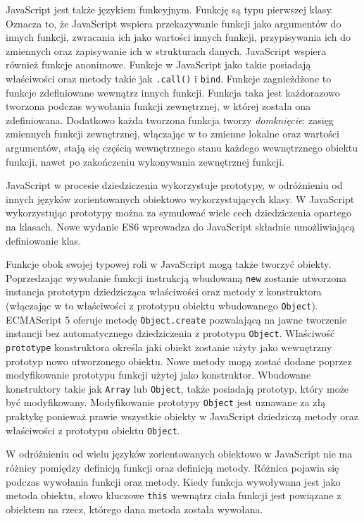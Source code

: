 JavaScript jest także językiem funkcyjnym. Funkcję są typu pierwszej klasy. Oznacza to, że JavaScript wspiera przekazywanie funkcji jako argumentów do innych funkcji, zwracania ich jako wartości innych funkcji, przypisywania ich do zmiennych oraz zapisywanie ich w strukturach danych. JavaScript wspiera również funkcje anonimowe\cite{fcfunctionWiki}. Funkcje w JavaScript jako takie posiadają właściwości oraz metody takie jak \verb|.call()| i \verb|bind|. Funkcje zagnieżdżone to funkcje zdefiniowane wewnątrz innych funkcji. Funkcja taka jest każdorazowo tworzona podczas wywołania funkcji zewnętrznej, w której została ona zdefiniowana. Dodatkowo każda tworzona funkcja tworzy \emph{domknięcie}: zasięg zmiennych funkcji zewnętrznej, włączając w to zmienne lokalne oraz wartości argumentów, stają się częścią wewnętrznego stanu każdego wewnętrznego obiektu funkcji, nawet po zakończeniu wykonywania zewnętrznej funkcji\cite{jsWiki}.

JavaScript w procesie dziedziczenia wykorzystuje prototypy, w odróżnieniu od innych języków zorientowanych obiektowo wykorzystujących klasy. W JavaScript wykorzystując prototypy można za symulować wiele cech dziedziczenia opartego na klasach\cite{jsWiki}. Nowe wydanie ES6 wprowadza do JavaScript składnie umożliwiającą definiowanie klas.  

Funkcje obok swojej typowej roli w JavaScript mogą także tworzyć obiekty. Poprzedzając wywołanie funkcji instrukcją wbudowaną \verb|new| zostanie utworzona instancja prototypu dziedzicząca właściwości oraz metody z konstruktora (włączając w to właściwości z prototypu obiektu wbudowanego \verb|Object|). ECMAScript 5 oferuje metodę \verb|Object.create| pozwalającą na jawne tworzenie instancji bez automatycznego dziedziczenia z prototypu \verb|Object|. Właściwość \verb|prototype| konstruktora określa jaki obiekt zostanie użyty jako wewnętrzny prototyp nowo utworzonego obiektu. Nowe metody mogą zostać dodane poprzez modyfikowanie prototypu funkcji użytej jako konstruktor. Wbudowane konstruktory takie jak \verb|Array| lub \verb|Object|, także posiadają prototyp, który może być modyfikowany. Modyfikowanie prototypy \verb|Object| jest uznawane za złą praktykę ponieważ prawie wszystkie obiekty w JavaScript dziedziczą metody oraz właściwości z prototypu obiektu \verb|Object|\cite{jsWiki}.

W odróżnieniu od wielu języków zorientowanych obiektowo w JavaScript nie ma różnicy pomiędzy definicją funkcji oraz definicją metody. Różnica pojawia się podczas wywołania funkcji oraz metody. Kiedy funkcja wywoływana jest jako metoda obiektu, słowo kluczowe \verb|this| wewnątrz ciała funkcji jest powiązane z obiektem na rzecz, którego dana metoda została wywołana\cite{jsWiki}. 

